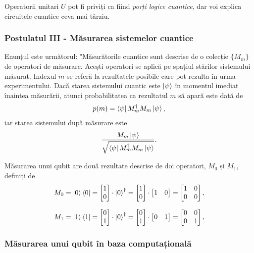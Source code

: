 Operatorii unitari $U$ pot fi priviți ca fiind \textit{porți logice cuantice}, dar voi explica circuitele cuantice ceva mai târziu.


\subsubsection{\textbf{Postulatul III} - Măsurarea sistemelor cuantice}

Enunțul este următorul: "Măsurătorile cuantice sunt descrise de o colecție $\{M_m\}$ de operatori de măsurare. Acești operatori se aplică pe spațiul stărilor sistemului măsurat. Indexul $m$ se referă la rezultatele posibile care pot rezulta în urma experimentului. Dacă starea sistemului cuantic este $\ket{\psi}$ în momentul imediat înaintea măsurării, atunci probabilitatea ca rezultatul $m$ să apară este dată de 
\[
p(m) = \bra{\psi}M^\dagger_m M_m \ket{\psi},
\]
iar starea sistemului după măsurare este
\[
\frac{M_m\ket{\psi}}{\sqrt{\bra{\psi}M^\dagger_m M_m \ket{\psi}}}.
\]

Măsurarea unui qubit are două rezultate descrise de doi operatori, $M_0$ și $M_1$, definiți de
\[
M_0 = \ket{0}\bra{0} = \begin{bmatrix}
1 \\ 0
\end{bmatrix} \cdot \ket{0}^\dagger =
\begin{bmatrix}
1 \\ 0
\end{bmatrix}
\cdot
\begin{bmatrix}
1 & 0
\end{bmatrix}
=
\begin{bmatrix}
1 & 0 \\
0 & 0
\end{bmatrix},
\]

\[
M_1 = \ket{1}\bra{1} = \begin{bmatrix}
0 \\ 1
\end{bmatrix} \cdot \ket{0}^\dagger =
\begin{bmatrix}
0 \\ 1
\end{bmatrix}
\cdot
\begin{bmatrix}
0 & 1
\end{bmatrix}
=
\begin{bmatrix}
0 & 0 \\
0 & 1
\end{bmatrix},
\]

\subsubsection{Măsurarea unui qubit în baza computațională}

